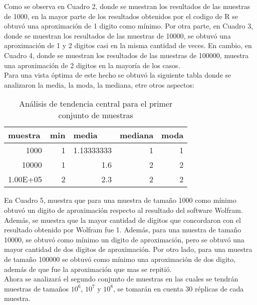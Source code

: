 \documentclass{report}
\begin{document}
\newpage

\noindent Como se observa en Cuadro 2, donde se muestran los resultados de las muestras de 1000, en la mayor parte de los resultados obtenidos por el codigo de R se obtuvó una aproximación de 1 digito como mínimo. Por otra parte, en Cuadro 3, donde se muestran los resultados de las muestras de 10000, se obtuvó una aproximación de 1 y 2 digitos casi en la misma cantidad de veces. En cambio, en Cuadro 4, donde se muestran los resultados de las muestras de 100000, muestra una aproximación de 2 digitos en la mayoría de los casos. \\

\noindent Para una vista óptima de este hecho se obtuvó la siguiente tabla donde se analizaron la media, la moda, la mediana, etre otros aspectos: \\

\begin{table}[htpb]
  \centering
    \begin{tabular}{rrrrr} \hline
    \multicolumn{1}{l}{muestra} & \multicolumn{1}{l}{min} & \multicolumn{1}{l}{media} & \multicolumn{1}{l}{mediana} & \multicolumn{1}{l}{moda} \\ \hline
    1000  & 1     & 1.13333333 & 1     & 1 \\ \hline
    10000 & 1     & 1.6   & 2     & 2 \\ \hline
    1.00E+05 & 2     & 2.3   & 2     & 2 \\ \hline
    \end{tabular}
    \caption{Análisis de tendencia central para el primer conjunto de muestras}
    \label{Análisis de tendencia central para todas las muestras}
\end{table}

\noindent En Cuadro 5, muestra que para una muestra de tamaño 1000 como mínimo obtuvó un digito de aproximación respecto al resultado del software Wolfram. Además, se muestra que la mayor cantidad de digitos que concordaron con el resultado obtenido por Wolfram fue 1. Además, para una muestra de tamaño 10000, se obtuvó como mínimo un digito de aproximación, pero se obtuvó una mayor cantidad de dos digitos de aproximación. Por otro lado, para una muestra de tamaño 100000 se obtuvó como mínimo una aproximación de dos digito, además de que fue la aproximación que mas se repitió. \\

\noindent Ahora se analizará el segundo conjunto de muestras en las cuales se tendrán muestras de tamaños $10^{6}$, $10^{7}$ y $10^{8}$, se tomarán en cuenta 30 réplicas de cada muestra.
\end{document}
